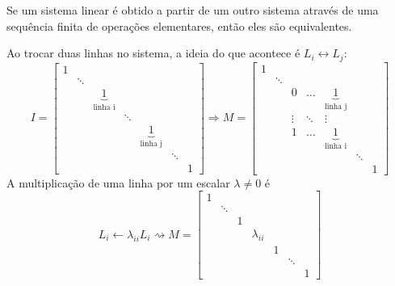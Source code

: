 \documentclass[../numerical_methods.tex]{subfiles}
\begin{document}
\begin{theorem*}
	Se um sistema linear é obtido a partir de um outro sistema através de uma sequência finita de operações elementares, então eles são equivalentes.
\end{theorem*}

Ao trocar duas linhas no sistema, a ideia do que acontece é \(L_{i}\leftrightarrow L_{j}:\)
\[
	I= \begin{bmatrix}
		1 &        &                                 &        &                                 &        &   \\
		  & \ddots &                                 &        &                                 &        &   \\
		  &        & \underbrace{1}_{\text{linha i}} &        &                                 &        &   \\
		  &        &                                 & \ddots &                                 &        &   \\
		  &        &                                 &        & \underbrace{1}_{\text{linha j}} &        &   \\
		  &        &                                 &        &                                 & \ddots &   \\
		  &        &                                 &        &                                 &        & 1
	\end{bmatrix} \Rightarrow M = \begin{bmatrix}
		1 &        &        &        &                                 &        &   \\
		  & \ddots &        &        &                                 &        &   \\
		  &        & 0      & \dotsc & \underbrace{1}_{\text{linha j}} &        &   \\
		  &        & \vdots & \ddots & \vdots                          &        &   \\
		  &        & 1      & \dotsc & \underbrace{1}_{\text{linha i}} &        &   \\
		  &        &        &        &                                 & \ddots &   \\
		  &        &        &        &                                 &        & 1
	\end{bmatrix}
\]
A multiplicação de uma linha por um escalar \(\lambda \neq 0\) é
\[
	L_{i}\leftarrow \lambda_{ii}L_{i}  \rightsquigarrow M = \begin{bmatrix}
		1 &        &   &              &   &        &   \\
		  & \ddots &   &              &   &        &   \\
		  &        & 1 &              &   &        &   \\
		  &        &   & \lambda_{ii} &   &        &   \\
		  &        &   &              & 1 &        &   \\
		  &        &   &              &   & \ddots &   \\
		  &        &   &              &   &        & 1
	\end{bmatrix}
\]
\end{document}
